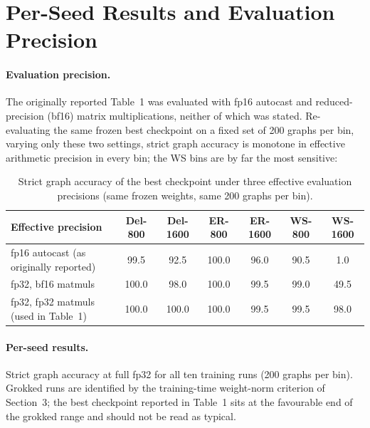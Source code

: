 \documentclass{article}
\begin{document}
\section{Per-Seed Results and Evaluation Precision}
\label{sec:perseed}

\paragraph{Evaluation precision.} The originally reported Table~1 was evaluated with fp16
autocast and reduced-precision (bf16) matrix multiplications, neither of which was stated.
Re-evaluating the same frozen best checkpoint on a fixed set of 200 graphs per bin, varying
only these two settings, strict graph accuracy is monotone in effective arithmetic
precision in every bin; the WS bins are by far the most sensitive:

\begin{table}[H]
  \caption{Strict graph accuracy of the best checkpoint under three effective evaluation
  precisions (same frozen weights, same 200 graphs per bin).}
  \label{precision-ladder}
  \centering
  \begin{tabular}{lcccccc}
    \toprule
    Effective precision & Del-800 & Del-1600 & ER-800 & ER-1600 & WS-800 & WS-1600 \\
    \midrule
    fp16 autocast (as originally reported) & 99.5 & 92.5 & 100.0 & 96.0 & 90.5 & 1.0 \\
    fp32, bf16 matmuls                     & 100.0 & 98.0 & 100.0 & 99.5 & 99.0 & 49.5 \\
    fp32, fp32 matmuls (used in Table~1)   & 100.0 & 100.0 & 100.0 & 99.5 & 99.5 & 98.0 \\
    \bottomrule
  \end{tabular}
\end{table}

\paragraph{Per-seed results.} Strict graph accuracy at full fp32 for all ten training runs
(200 graphs per bin). Grokked runs are identified by the training-time weight-norm
criterion of Section~3; the best checkpoint reported in Table~1 sits at the favourable end
of the grokked range and should not be read as typical.
\end{document}
